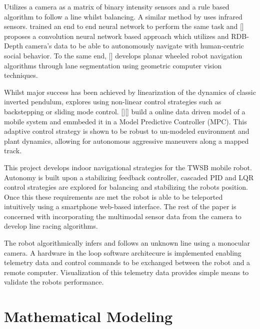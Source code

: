     \cite{visionlinetwsb} Utilizes a camera as a matrix of binary intensity sensors 
    and a rule based algorithm to  follow a line whilst balancing. A similar method by \cite{ghani2011two} uses 
    infrared sensors. \cite{nntwsbvison} trained an end to end neural network to perform the same task and [] proposes 
    a convolution neural network based approach which utilizes and RDB-Depth camera's data to be able to 
    autonomously navigate with human-centric social behavior. 
    To the same end, [] develops planar wheeled robot navigation algorithms through lane segmentation using 
    geometric computer vision techniques. 

    Whilst major success has been achieved by linearization of the dynamics of classic inverted pendulum, 
    \cite{AdvancedWIP} explores using non-linear control strategies such as backstepping or sliding mode control.
    [][] build a online data driven model of a mobile system and emmbeded it in a Model Predictive Controller (MPC). 
    This adaptive control strategy is shown to be robust to un-modeled environment and plant dynamics, 
    allowing for autonomous aggressive maneuvers along a mapped track.
    
    This project develops indoor navigational strategies for the TWSB mobile robot. Autonomy is built upon a stabilizing 
    feedback controller, cascaded PID and LQR control strategies are explored for balancing and stabilizing the robots position. 
    Once this these requirements are met the 
    robot is able to be teleported intuitively using a smartphone web-based interface. The rest of the paper is 
    concerned with incorporating the multimodal 
    sensor data from the camera to develop line racing algorithms. 
    
    The robot algorithmically infers and follows an unknown line 
    using a monocular camera. A hardware in the loop software architecure is 
    implemented enabling telemetry data and control commands to be exchanged between the robot 
    and a remote computer. Visualization of this telemetry data provides simple
    means to validate the robots performance. 
    \pagebreak{}

    \section{Mathematical Modeling} %
